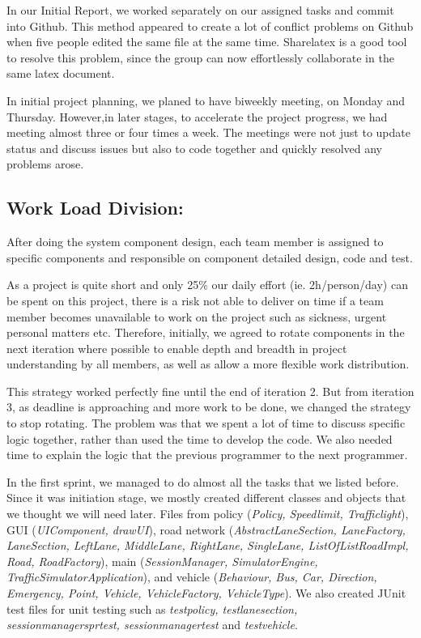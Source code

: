 \documentclass[11pt]{article}
\begin{document}
In our Initial Report, we  worked  separately on our assigned tasks and commit into Github. This method appeared to create a lot of conflict problems on Github when five people edited the same file at the same time. 
Sharelatex is a good tool to resolve this problem, since the group can now effortlessly collaborate in the same latex document. 

In initial project planning, we planed to have biweekly meeting, on Monday and Thursday. However,in later stages, to accelerate the project progress, we had meeting almost three or four times a week. The meetings were not just to update status and discuss issues but also to code together and quickly resolved any problems arose.



\subsection{Work Load Division:}

After doing the system component design, each team member is assigned to specific components and responsible on component detailed design, code and test. 

As a project is quite short and only 25\% our daily effort (ie. 2h/person/day) can be spent on this project, there is a risk not able to deliver on time if a team member becomes unavailable to work on the project such as sickness, urgent personal matters etc. Therefore, initially, we agreed to rotate components in the next iteration where possible to enable  depth and breadth in project understanding by all members, as well as allow a more flexible work distribution.

This strategy worked perfectly fine until the end of iteration 2. But from iteration 3, as deadline is approaching and more work to be done, we changed the strategy to stop rotating. The problem was that we spent a lot of time to discuss specific logic together, rather than used the time to develop the code. We also needed time to explain the logic that the previous programmer to the next programmer. 

In the first sprint,  we managed to do almost all the tasks that we listed before. Since it was  initiation stage, we mostly created different classes and objects that we thought we will need later. Files from policy (\textit{Policy, Speedlimit, Trafficlight}), GUI (\textit{UIComponent, drawUI}), road network (\textit{AbstractLaneSection, LaneFactory, LaneSection, LeftLane, MiddleLane, RightLane, SingleLane, ListOfListRoadImpl, Road, RoadFactory}), main (\textit{SessionManager, SimulatorEngine, TrafficSimulatorApplication}), and vehicle (\textit{Behaviour, Bus, Car, Direction, Emergency, Point, Vehicle, VehicleFactory, VehicleType}). We also created JUnit test files for unit testing such as \textit{testpolicy, testlanesection, sessionmanagersprtest, sessionmanagertest} and \textit{testvehicle}. 
\end{document}

